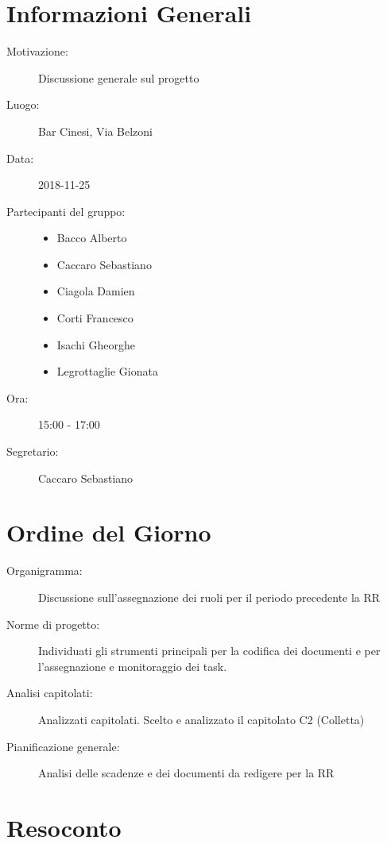 \documentclass[a4paper, oneside, openany, dvipsnames, table]{article}
\begin{document}
\copertina{}


\newpage
\tableofcontents
\newpage

\section{Informazioni Generali}
\begin{description}
\item [Motivazione:] Discussione generale sul progetto
\item [Luogo:] Bar Cinesi, Via Belzoni
\item [Data:] 2018-11-25
\item [Partecipanti del gruppo:] \hfill
	\begin{itemize}
	\item Bacco Alberto
	\item Caccaro Sebastiano
	\item Ciagola Damien
	\item Corti Francesco
	\item Isachi Gheorghe
	\item Legrottaglie Gionata
	\end{itemize} 
\item [Ora:] 15:00 - 17:00
\item [Segretario:] Caccaro Sebastiano
\end{description}

\section{Ordine del Giorno}
\begin{description}
\item [Organigramma:] Discussione sull'assegnazione dei ruoli per il periodo precedente la RR
\item [Norme di progetto:] Individuati gli strumenti principali per la codifica dei documenti e per l'assegnazione e monitoraggio dei task.
\item [Analisi capitolati:] Analizzati capitolati. Scelto e analizzato il capitolato C2 (Colletta)
\item [Pianificazione generale:] Analisi delle scadenze e dei documenti da redigere per la RR
\end{description}

\section{Resoconto}
\end{document}
